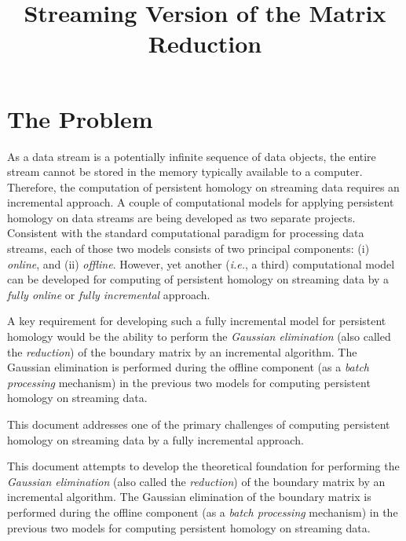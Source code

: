 \documentclass[11pt]{article}
\begin{document}
\title{Streaming Version of the Matrix Reduction}

\maketitle

\section{The Problem}

As a data stream is a potentially infinite sequence of data objects, the entire stream cannot be 
stored in the memory typically available to a computer.  Therefore, the computation of persistent 
homology on streaming data requires an incremental approach.  A couple of computational models for 
applying persistent homology on data streams are being developed as two separate projects.  
Consistent with the standard computational paradigm \cite{silva-13} for processing data streams, 
each of those two models consists of two principal components: (i) \emph{online}, and (ii) 
\emph{offline}.  However, yet another (\emph{i.e.}, a third) computational model can be developed 
for computing of persistent homology on streaming data by a \emph{fully online} or \emph{fully 
incremental} approach.


A key requirement for developing such a fully incremental model for persistent homology would be 
the ability to perform the \emph{Gaussian elimination} (also called the \emph{reduction}) of the 
boundary matrix \cite{edelsbrunner-00, zomorodian-05} by an incremental algorithm.  The Gaussian 
elimination is performed during the offline component (as a \emph{batch processing} mechanism) in 
the previous two models for computing persistent homology on streaming data.


This document addresses one of the primary challenges of computing persistent homology on streaming 
data by a fully incremental approach.  

 


This document attempts to develop 
the theoretical foundation for performing the \emph{Gaussian elimination} (also called the 
\emph{reduction}) of the boundary matrix \cite{edelsbrunner-00, zomorodian-05} by an incremental 
algorithm.  The Gaussian elimination of the boundary matrix is performed during the offline 
component (as a \emph{batch processing} mechanism) in the previous two models for computing 
persistent homology on streaming data.
\end{document}
